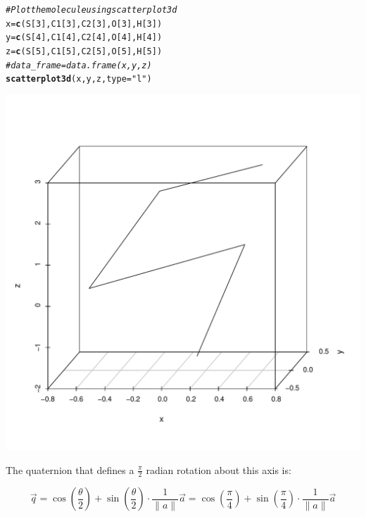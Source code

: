 \documentclass{article}\usepackage[]{graphicx}\usepackage[]{color}
\makeatletter
\def\maxwidth{ %
  \ifdim\Gin@nat@width>\linewidth
    \linewidth
  \else
    \Gin@nat@width
  \fi
}
\newcommand{\hlnum}[1]{\textcolor[rgb]{0.686,0.059,0.569}{#1}}%
\newcommand{\hlstr}[1]{\textcolor[rgb]{0.192,0.494,0.8}{#1}}%
\newcommand{\hlcom}[1]{\textcolor[rgb]{0.678,0.584,0.686}{\textit{#1}}}%
\newcommand{\hlstd}[1]{\textcolor[rgb]{0.345,0.345,0.345}{#1}}%
\newcommand{\hlkwb}[1]{\textcolor[rgb]{0.69,0.353,0.396}{#1}}%
\newcommand{\hlkwc}[1]{\textcolor[rgb]{0.333,0.667,0.333}{#1}}%
\newcommand{\hlkwd}[1]{\textcolor[rgb]{0.737,0.353,0.396}{\textbf{#1}}}%
\newenvironment{kframe}{%
 \def\at@end@of@kframe{}%
 \ifinner\ifhmode%
  \def\at@end@of@kframe{\end{minipage}}%
  \begin{minipage}{\columnwidth}%
 \fi\fi%
 \def\FrameCommand##1{\hskip\@totalleftmargin \hskip-\fboxsep
 \colorbox{shadecolor}{##1}\hskip-\fboxsep
     \hskip-\linewidth \hskip-\@totalleftmargin \hskip\columnwidth}%
 \MakeFramed {\advance\hsize-\width
   \@totalleftmargin\z@ \linewidth\hsize
   \@setminipage}}%
 {\par\unskip\endMakeFramed%
 \at@end@of@kframe}
\newenvironment{knitrout}{}{} %
\makeatother
\begin{document}
\begin{knitrout}
\begin{kframe}
{\ttfamily\noindent\itshape\color{messagecolor}{\#\# The normed axis of rotation is: 0.205342766021818, 0, 0.978690118700761}}\begin{alltt}
  \hlcom{#Plot the molecule using scatterplot3d}
  \hlstd{x} \hlkwb{=} \hlkwd{c}\hlstd{(S[}\hlnum{3}\hlstd{],C1[}\hlnum{3}\hlstd{],C2[}\hlnum{3}\hlstd{],O[}\hlnum{3}\hlstd{],H[}\hlnum{3}\hlstd{])}
  \hlstd{y} \hlkwb{=} \hlkwd{c}\hlstd{(S[}\hlnum{4}\hlstd{],C1[}\hlnum{4}\hlstd{],C2[}\hlnum{4}\hlstd{],O[}\hlnum{4}\hlstd{],H[}\hlnum{4}\hlstd{])}
  \hlstd{z} \hlkwb{=} \hlkwd{c}\hlstd{(S[}\hlnum{5}\hlstd{],C1[}\hlnum{5}\hlstd{],C2[}\hlnum{5}\hlstd{],O[}\hlnum{5}\hlstd{],H[}\hlnum{5}\hlstd{])}
  \hlcom{#data_frame = data.frame(x,y,z)}
  \hlkwd{scatterplot3d}\hlstd{(x,y,z,}\hlkwc{type} \hlstd{=} \hlstr{"l"}\hlstd{)}
\end{alltt}
\end{kframe}
\includegraphics[width=\maxwidth]{figure/define-axis-pi-div-2-1} 

\end{knitrout}

The quaternion that defines a $\frac{\pi}{2}$ radian rotation about this axis is:

$$\vec{q}=\cos(\frac{\theta}{2})+\sin(\frac{\theta}{2})\cdot\frac{1}{\| a \|}\vec{a}=\cos(\frac{\pi}{4})+\sin(\frac{\pi}{4})\cdot\frac{1}{\| a \|}\vec{a}$$
\end{document}
